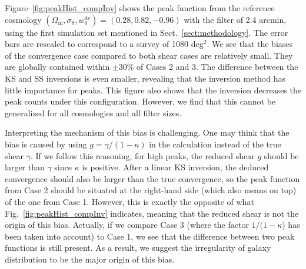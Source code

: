 \documentclass{aa} %
\newcommand{\fig}[1]{Fig.~\ref{#1}}
\newcommand{\figFull}[1]{Figure~\ref{#1}}
\newcommand{\sect}[1]{Sect.~\ref{#1}}
\newcommand{\OmegaM}{\Omega_\mathrm{m}}
\newcommand{\sigEig}{\sigma_8}
\newcommand{\wZero}{w_0^\mathrm{de}}
\begin{document}
\figFull{fig:peakHist_compInv} shows the peak function from the reference cosmology $(\OmegaM, \sigEig, \wZero) = (0.28, 0.82, -0.96)$ with the filter of 2.4 arcmin, using the first simulation set mentioned in \sect{sect:methodology}. The error bars are rescaled to correspond to a survey of 1080 deg$^2$. We see that the biases of the convergence case compared to both shear cases are relatively small. They are globally contained within $\pm$30\% of Cases 2 and 3. The difference between the KS and SS inversions is even smaller, revealing that the inversion method has little importance for  peaks. This figure also shows that the inversion decreases the peak counts under this configuration. However, we find that this cannot be generalized for all cosmologies and all filter sizes.

Interpreting the mechanism of this bias is challenging. One may think that the bias is caused by using $g=\gamma/(1-\kappa)$ in the calculation instead of the true shear $\gamma$. If we follow this reasoning, for high peaks, the reduced shear $g$ should be larger than $\gamma$ since $\kappa$ is positive. After a linear KS inversion, the deduced convergence should also be larger than the true convergence, so the peak function from Case 2 should be situated at the right-hand side (which also means on top) of the one from Case 1. However, this is exactly the opposite of what \fig{fig:peakHist_compInv} indicates, meaning that the reduced shear is not the origin of this bias. Actually, if we compare Case 3 (where the factor $1/(1-\kappa$) has been taken into account) to Case 1, we see that the difference between two peak functions is still present. As a result, we suggest the irregularity of galaxy distribution to be the major origin of this bias.
\end{document}
